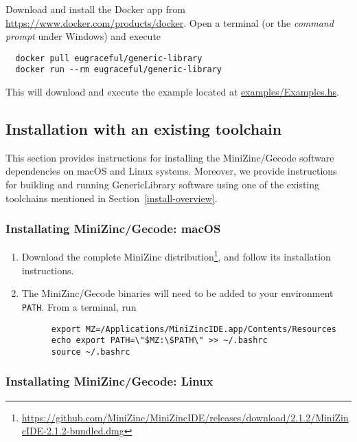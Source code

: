 Download and install the Docker app from \url{https://www.docker.com/products/docker}.
%
Open a terminal (or the \emph{command prompt} under Windows) and
execute
\begin{verbatim}
  docker pull eugraceful/generic-library
  docker run --rm eugraceful/generic-library
\end{verbatim}

This will download and execute the example located at
\href{https://github.com/GRACeFUL-project/GenericLibrary/blob/master/examples/Examples.hs}{examples/Examples.hs}.

\subsection{Installation with an existing toolchain}
\label{install-minizinc}

This section provides instructions for installing the MiniZinc/Gecode
software dependencies on macOS and Linux systems.
%
Moreover, we provide instructions for building and running
GenericLibrary software using one of the existing toolchains mentioned
in Section~\ref{install-overview}.


\subsubsection{Installating MiniZinc/Gecode: macOS}

\begin{enumerate}
\item Download the complete MiniZinc
  distribution\footnote{\url{https://github.com/MiniZinc/MiniZincIDE/releases/download/2.1.2/MiniZincIDE-2.1.2-bundled.dmg}},
  and follow its installation instructions.
\item The MiniZinc/Gecode binaries will need to be added to your
  environment \verb+PATH+. From a terminal, run
%
    \begin{verbatim}
      export MZ=/Applications/MiniZincIDE.app/Contents/Resources
      echo export PATH=\"$MZ:\$PATH\" >> ~/.bashrc
      source ~/.bashrc
    \end{verbatim}
\end{enumerate}


\subsubsection{Installating MiniZinc/Gecode: Linux}

